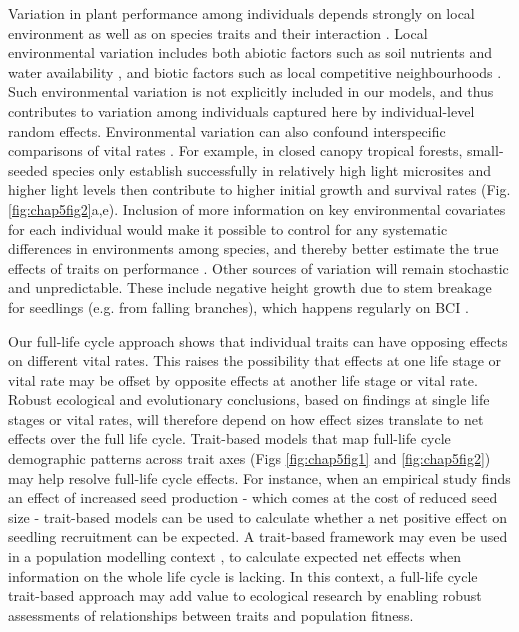 \documentclass[b5paper,justified]{tufte-book} %
\begin{document}
\begin{fullwidth}
Variation in plant performance among individuals depends strongly on local environment as well as on species traits and their interaction \citep{Uriarte2016}. Local environmental variation includes both abiotic factors such
as soil nutrients \citep{Condit2013} and water availability \citep{Comita2009a}, and biotic factors such as
local competitive neighbourhoods \citep{Uriarte2004}. Such environmental variation is not explicitly included in
our models, and thus contributes to variation among individuals captured here by individual-level random effects.
Environmental variation can also confound interspecific comparisons of vital rates \citep{Lichstein2010, McMahon2011,  Baraloto2012}. For example, in closed canopy tropical forests, small-seeded species only establish successfully in relatively high light microsites and higher light levels then contribute to higher initial growth and survival rates (Fig. \ref{fig:chap5fig2}a,e). Inclusion of more information on key environmental covariates for each individual would make it possible to control for any systematic differences in environments among species, and thereby better estimate the true effects of traits on performance \citep{Paine2011, Lasky2014}. Other sources of variation will remain stochastic and unpredictable. These include negative height growth due to stem breakage for seedlings (e.g. from falling branches), which happens regularly on BCI \citep{Paciorek2000}.


Our full-life cycle approach shows that individual traits can have opposing effects on different vital rates. This
raises the possibility that effects at one life stage or vital rate may be offset by opposite effects at another life stage or vital rate. Robust ecological and evolutionary conclusions, based on findings at single life stages or vital rates, will therefore depend on how effect sizes translate to net effects over the full life cycle. Trait-based models that map full-life cycle demographic patterns across trait axes (Figs \ref{fig:chap5fig1} and \ref{fig:chap5fig2}) may help resolve full-life cycle effects. For instance, when an empirical study finds an effect of increased seed production - which comes at the cost of reduced seed size - trait-based models can be used to calculate whether a net positive effect on seedling recruitment can be expected. A trait-based framework may even be
used in a population modelling context \citep[\textit{sensu}][]{Visser2011, Merow2014}, to calculate expected net effects when information on the whole life cycle is lacking. In this context, a full-life cycle trait-based approach may add value to ecological research by enabling robust assessments of relationships between traits and population fitness. 


\end{fullwidth}
\end{document}
